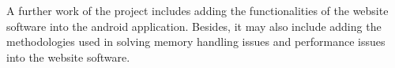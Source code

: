 \documentclass[MSc]{icldt}
\begin{document}
A further work of the project includes adding the functionalities of the website software into the android application. Besides, it may also include adding the methodologies used in solving memory handling issues and performance issues into the website software. ~\cite{abramowitz}






{}

\end{document}

